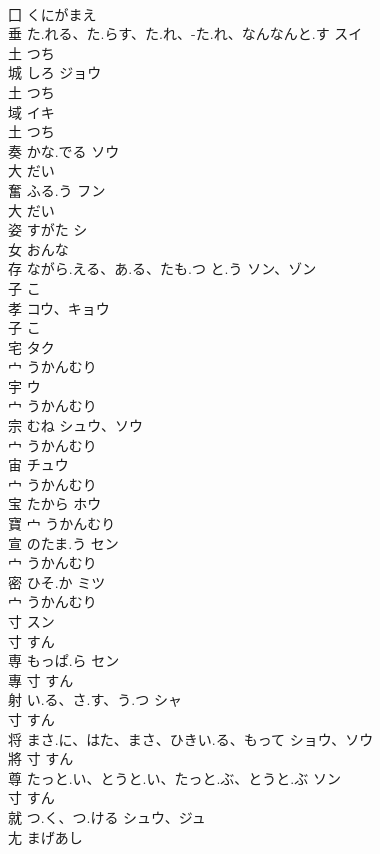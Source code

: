 \documentclass[8pt]{extreport}
\begin{document}
\begin{CJK}{UTF8}{min}
\\	囗		くにがまえ		
\\	垂	た.れる、た.らす、た.れ、-た.れ、なんなんと.す	スイ	
\\	土		つち		
\\	城	しろ	ジョウ	
\\	土		つち		
\\	域		イキ	
\\	土		つち		
\\	奏	かな.でる	ソウ	
\\	大		だい		
\\	奮	ふる.う	フン	
\\	大		だい		
\\	姿	すがた	シ	
\\	女		おんな		
\\	存	ながら.える、あ.る、たも.つ と.う	ソン、ゾン	
\\	子		こ		
\\	孝		コウ、キョウ	
\\	子		こ		
\\	宅		タク	
\\	宀		うかんむり		
\\	宇		ウ	
\\	宀		うかんむり		
\\	宗	むね	シュウ、ソウ	
\\	宀		うかんむり		
\\	宙		チュウ	
\\	宀		うかんむり		
\\	宝	たから	ホウ	
\\	寶	宀		うかんむり		
\\	宣	のたま.う	セン	
\\	宀		うかんむり		
\\	密	ひそ.か	ミツ	
\\	宀		うかんむり		
\\	寸		スン	
\\	寸		すん		
\\	専	もっぱ.ら	セン	
\\	專	寸		すん		
\\	射	い.る、さ.す、う.つ	シャ	
\\	寸		すん		
\\	将	まさ.に、はた、まさ、ひきい.る、もって	ショウ、ソウ	
\\	將	寸		すん		
\\	尊	たっと.い、とうと.い、たっと.ぶ、とうと.ぶ	ソン	
\\	寸		すん		
\\	就	つ.く、つ.ける	シュウ、ジュ	
\\	尢		まげあし		

\end{CJK}
\end{document}
